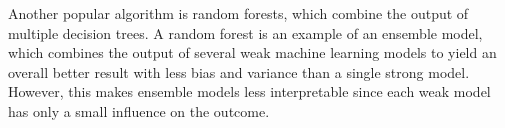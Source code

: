 Another popular algorithm is random forests, which combine the output of multiple decision trees.
A random forest is an example of an ensemble model, which combines the output of several weak machine learning models to yield an overall better result with less bias and variance than a single strong model.
However, this makes ensemble models less interpretable since each weak model has only a small influence on the outcome.
